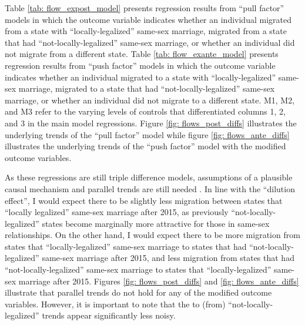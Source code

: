 \documentclass[12pt,letterpaper]{article}
\begin{document}
Table \ref{tab: flow_expost_model} presents regression results from “pull factor” models in which the outcome variable indicates whether an individual migrated from a state with “locally-legalized” same-sex marriage, migrated from a state that had “not-locally-legalized” same-sex marriage, or whether an individual did not migrate from a different state. Table \ref{tab: flow_exante_model} presents regression results from “push factor” models in which the outcome variable indicates whether an individual migrated to a state with “locally-legalized” same-sex marriage, migrated to a state that had “not-locally-legalized” same-sex marriage, or whether an individual did not migrate to a different state. M1, M2, and M3 refer to the varying levels of controls that differentiated columns 1, 2, and 3 in the main model regressions.  Figure \ref{fig: flows_post_diffs} illustrates the underlying trends of the “pull factor” model while figure \ref{fig: flows_ante_diffs} illustrates the underlying trends of the “push factor” model with the modified outcome variables.

As these regressions are still triple difference models, assumptions of a plausible causal mechanism and parallel trends are still needed \citep{24, 25}. In line with the “dilution effect”, I would expect there to be slightly less migration between states that “locally legalized” same-sex marriage after 2015, as previously “not-locally-legalized” states become marginally more attractive for those in same-sex relationships. On the other hand, I would expect there to be more migration from states that “locally-legalized” same-sex marriage to states that had “not-locally-legalized” same-sex marriage after 2015, and less migration from states that had “not-locally-legalized” same-sex marriage to states that “locally-legalized” same-sex marriage after 2015. Figures \ref{fig: flows_post_diffs} and \ref{fig: flows_ante_diffs} illustrate that parallel trends do not hold for any of the modified outcome variables. However, it is important to note that the to (from) “not-locally-legalized” trends appear significantly less noisy.
\end{document}
